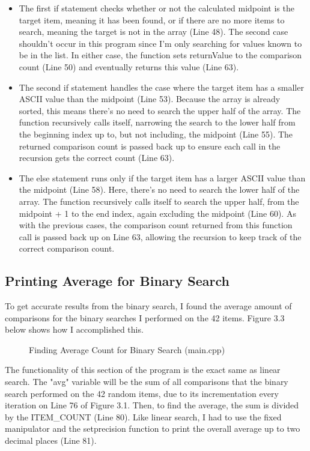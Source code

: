 \documentclass[letterpaper, 10pt]{article}
\begin{document}
\begin{itemize}
    \item The first if statement checks whether or not the calculated midpoint is the target item, meaning it has been found, or if there are no more items to search, meaning the target is not in the array (Line 48). The second case shouldn’t occur in this program since I’m only searching for values known to be in the list. In either case, the function sets returnValue to the comparison count (Line 50) and eventually returns this value (Line 63).
    \item The second if statement handles the case where the target item has a smaller ASCII value than the midpoint (Line 53). Because the array is already sorted, this means there’s no need to search the upper half of the array. The function recursively calls itself, narrowing the search to the lower half from the beginning index up to, but not including, the midpoint (Line 55). The returned comparison count is passed back up to ensure each call in the recursion gets the correct count (Line 63).
    \item The else statement runs only if the target item has a larger ASCII value than the midpoint (Line 58). Here, there’s no need to search the lower half of the array. The function recursively calls itself to search the upper half, from the midpoint + 1 to the end index, again excluding the midpoint (Line 60). As with the previous cases, the comparison count returned from this function call is passed back up on Line 63, allowing the recursion to keep track of the correct comparison count.
\end{itemize}

\subsection{Printing Average for Binary Search}
\noindent
To get accurate results from the binary search, I found the average amount of comparisons for the binary searches I performed on the 42 items. Figure 3.3 below shows how I accomplished this.

\begin{figure}[H]
  \centering
   
  \caption{Finding Average Count for Binary Search (main.cpp)}
  \label{fig:figure3.3}
\end{figure}

\noindent
The functionality of this section of the program is the exact same as linear search. The "avg" variable will be the sum of all comparisons that the binary search performed on the 42 random items, due to its incrementation every iteration on Line 76 of Figure 3.1. Then, to find the average, the sum is divided by the ITEM\_COUNT (Line 80). Like linear search, I had to use the fixed manipulator and the setprecision function to print the overall average up to two decimal places (Line 81).
\end{document}
